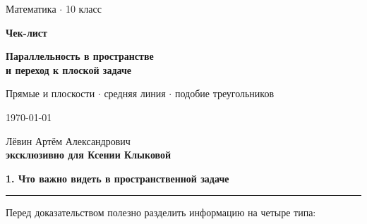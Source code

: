 \documentclass[a4paper,12pt]{article}
\newcommand{\lessonsection}[1]{%
  \vspace{0.4em}
  {\Large\bfseries\color{darkaccent}#1}\par
  \vspace{0.25em}
  {\color{lightaccent}\rule{\linewidth}{0.8pt}}
  \vspace{0.6em}
}
\begin{document}
\begin{titlepage}
\thispagestyle{empty}

\begin{center}

\vspace*{24mm}

{\large\color{softgray}Математика $\cdot$ 10 класс}

\vspace{12mm}

{\Huge\bfseries\color{darkaccent}Чек-лист}

\vspace{5mm}

{\LARGE\bfseries
Параллельность в пространстве\\[2mm]
и переход к плоской задаче}

\vspace{13mm}

{\large
Прямые и плоскости $\cdot$
средняя линия $\cdot$
подобие треугольников}

\vfill

{\large \today}

\vspace{9mm}

{\large
Лёвин Артём Александрович\\[2mm]
\textbf{эксклюзивно для Ксении Клыковой}}

\vspace{20mm}


\vspace{5mm}

\end{center}
\end{titlepage}

\setcounter{page}{1}

\lessonsection{1. Что важно видеть в пространственной задаче}

Перед доказательством полезно разделить информацию на четыре типа:
\end{document}
